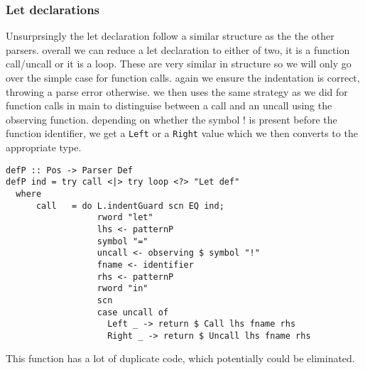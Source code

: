 \documentclass[a4paper]{article}
\begin{document}
\subsubsection{Let declarations}
\label{sec:orgc46ab7b}
Unsurprsingly the let declaration follow a similar structure as the the other parsers. overall we can reduce a let declaration to either of two, it is a function call/uncall or it is a loop. These are very similar in structure so we will only go over the simple case for function calls. again we ensure the indentation is correct, throwing a parse error otherwise. we then uses the same strategy as we did for function calls in main to distinguise between a call and an uncall using the observing function. depending on whether the symbol ! is present before the function identifier, we get a \texttt{Left} or a \texttt{Right} value which we then converts to the appropriate type.
\begin{verbatim}
defP :: Pos -> Parser Def
defP ind = try call <|> try loop <?> "Let def"
  where
      call   = do L.indentGuard scn EQ ind;
                  rword "let"
                  lhs <- patternP
                  symbol "="
                  uncall <- observing $ symbol "!"
                  fname <- identifier
                  rhs <- patternP
                  rword "in"
                  scn
                  case uncall of
                    Left _ -> return $ Call lhs fname rhs
                    Right _ -> return $ Uncall lhs fname rhs
\end{verbatim}
This function has a lot of duplicate code, which potentially could be eliminated.
\end{document}
